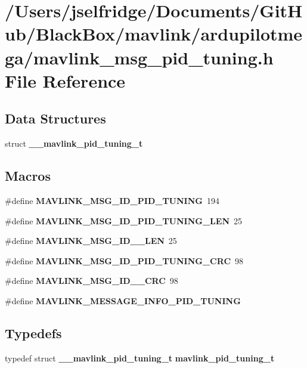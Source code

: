 \section{/\+Users/jselfridge/\+Documents/\+Git\+Hub/\+Black\+Box/mavlink/ardupilotmega/mavlink\+\_\+msg\+\_\+pid\+\_\+tuning.h File Reference}
\label{mavlink__msg__pid__tuning_8h}
\subsection*{Data Structures}
\begin{DoxyCompactItemize}
\item 
struct \textbf{ \+\_\+\+\_\+mavlink\+\_\+pid\+\_\+tuning\+\_\+t}
\end{DoxyCompactItemize}
\subsection*{Macros}
\begin{DoxyCompactItemize}
\item 
\#define \textbf{ M\+A\+V\+L\+I\+N\+K\+\_\+\+M\+S\+G\+\_\+\+I\+D\+\_\+\+P\+I\+D\+\_\+\+T\+U\+N\+I\+NG}~194
\item 
\#define \textbf{ M\+A\+V\+L\+I\+N\+K\+\_\+\+M\+S\+G\+\_\+\+I\+D\+\_\+\+P\+I\+D\+\_\+\+T\+U\+N\+I\+N\+G\+\_\+\+L\+EN}~25
\item 
\#define \textbf{ M\+A\+V\+L\+I\+N\+K\+\_\+\+M\+S\+G\+\_\+\+I\+D\+\_\+\_\+\+L\+EN}~25
\item 
\#define \textbf{ M\+A\+V\+L\+I\+N\+K\+\_\+\+M\+S\+G\+\_\+\+I\+D\+\_\+\+P\+I\+D\+\_\+\+T\+U\+N\+I\+N\+G\+\_\+\+C\+RC}~98
\item 
\#define \textbf{ M\+A\+V\+L\+I\+N\+K\+\_\+\+M\+S\+G\+\_\+\+I\+D\+\_\+\_\+\+C\+RC}~98
\item 
\#define \textbf{ M\+A\+V\+L\+I\+N\+K\+\_\+\+M\+E\+S\+S\+A\+G\+E\+\_\+\+I\+N\+F\+O\+\_\+\+P\+I\+D\+\_\+\+T\+U\+N\+I\+NG}
\end{DoxyCompactItemize}
\subsection*{Typedefs}
\begin{DoxyCompactItemize}
\item 
typedef struct \textbf{ \+\_\+\+\_\+mavlink\+\_\+pid\+\_\+tuning\+\_\+t} \textbf{ mavlink\+\_\+pid\+\_\+tuning\+\_\+t}
\end{DoxyCompactItemize}


